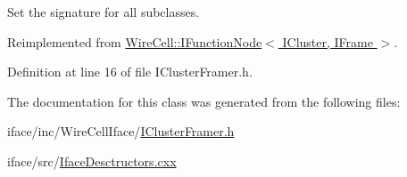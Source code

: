Set the signature for all subclasses. 



Reimplemented from \hyperlink{class_wire_cell_1_1_i_function_node_af59f46cf19ca9fdf4aade1f289feedf2}{Wire\+Cell\+::\+I\+Function\+Node$<$ I\+Cluster, I\+Frame $>$}.



Definition at line 16 of file I\+Cluster\+Framer.\+h.



The documentation for this class was generated from the following files\+:\begin{DoxyCompactItemize}
\item 
iface/inc/\+Wire\+Cell\+Iface/\hyperlink{_i_cluster_framer_8h}{I\+Cluster\+Framer.\+h}\item 
iface/src/\hyperlink{_iface_desctructors_8cxx}{Iface\+Desctructors.\+cxx}\end{DoxyCompactItemize}
